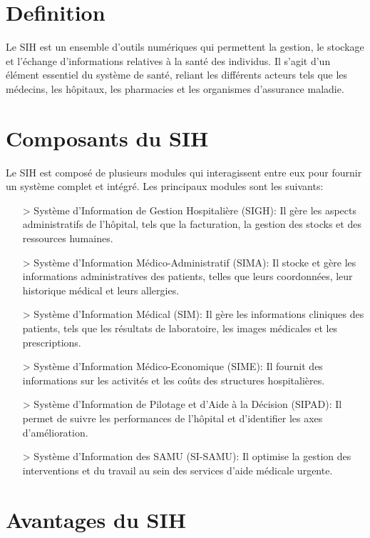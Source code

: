 \documentclass[12pt]{rapportINPTCLOUD}
\begin{document}
	\section{Definition}
	
	Le SIH est un ensemble d'outils numériques qui permettent la gestion, le stockage et l'échange d'informations relatives à la santé des individus. Il s'agit d'un élément essentiel du système de santé, reliant les différents acteurs tels que les médecins, les hôpitaux, les pharmacies et les organismes d'assurance maladie.	
	\section{Composants du SIH}
	
	Le SIH est composé de plusieurs modules qui interagissent entre eux pour fournir un système complet et intégré. Les principaux modules sont les suivants:
	
	\begin{itemize}
		\item[>] 	Système d'Information de Gestion Hospitalière (SIGH): Il gère les aspects administratifs de l'hôpital, tels que la facturation, la gestion des stocks et des ressources humaines.
		\item[>] 	Système d'Information Médico-Administratif (SIMA): Il stocke et gère les informations administratives des patients, telles que leurs coordonnées, leur historique médical et leurs allergies.
		\item[>] 	Système d'Information Médical (SIM): Il gère les informations cliniques des patients, tels que les résultats de laboratoire, les images médicales et les prescriptions.
		\item[>] 	Système d'Information Médico-Economique (SIME): Il fournit des informations sur les activités et les coûts des structures hospitalières.
		\item[>] 	Système d'Information de Pilotage et d'Aide à la Décision (SIPAD): Il permet de suivre les performances de l'hôpital et d'identifier les axes d'amélioration.
		\item[>] 	Système d'Information des SAMU (SI-SAMU): Il optimise la gestion des interventions et du travail au sein des services d'aide médicale urgente.
	\end{itemize}
	
	
	\section{Avantages du SIH}
	
\end{document}
